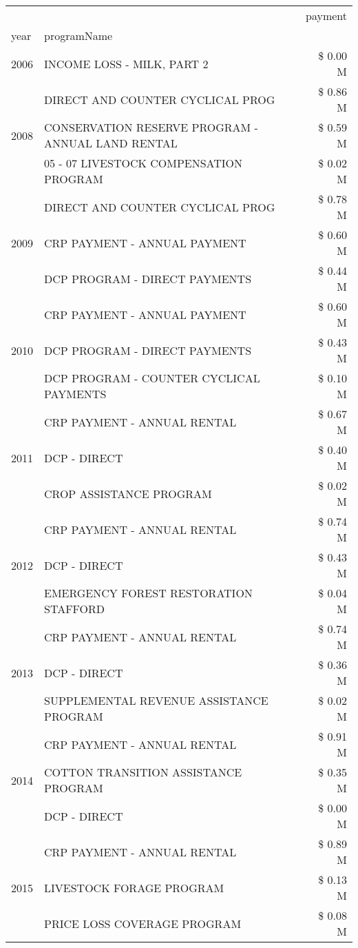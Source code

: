 \begin{tabular}{llr}
\toprule
 &  & payment \\
year & programName &  \\
\midrule
2006 & INCOME LOSS - MILK, PART 2 & \$ 0.00 M \\
\cline{1-3}
\multirow[t]{3}{*}{2008} & DIRECT AND COUNTER CYCLICAL PROG & \$ 0.86 M \\
 & CONSERVATION RESERVE PROGRAM - ANNUAL LAND RENTAL & \$ 0.59 M \\
 & 05 - 07 LIVESTOCK COMPENSATION PROGRAM & \$ 0.02 M \\
\cline{1-3}
\multirow[t]{3}{*}{2009} & DIRECT AND COUNTER CYCLICAL PROG & \$ 0.78 M \\
 & CRP PAYMENT - ANNUAL PAYMENT & \$ 0.60 M \\
 & DCP PROGRAM - DIRECT PAYMENTS & \$ 0.44 M \\
\cline{1-3}
\multirow[t]{3}{*}{2010} & CRP PAYMENT - ANNUAL PAYMENT & \$ 0.60 M \\
 & DCP PROGRAM - DIRECT PAYMENTS & \$ 0.43 M \\
 & DCP PROGRAM - COUNTER CYCLICAL PAYMENTS & \$ 0.10 M \\
\cline{1-3}
\multirow[t]{3}{*}{2011} & CRP PAYMENT - ANNUAL RENTAL & \$ 0.67 M \\
 & DCP - DIRECT & \$ 0.40 M \\
 & CROP ASSISTANCE PROGRAM & \$ 0.02 M \\
\cline{1-3}
\multirow[t]{3}{*}{2012} & CRP PAYMENT - ANNUAL RENTAL & \$ 0.74 M \\
 & DCP - DIRECT & \$ 0.43 M \\
 & EMERGENCY FOREST RESTORATION STAFFORD & \$ 0.04 M \\
\cline{1-3}
\multirow[t]{3}{*}{2013} & CRP PAYMENT - ANNUAL RENTAL & \$ 0.74 M \\
 & DCP - DIRECT & \$ 0.36 M \\
 & SUPPLEMENTAL REVENUE ASSISTANCE PROGRAM & \$ 0.02 M \\
\cline{1-3}
\multirow[t]{3}{*}{2014} & CRP PAYMENT - ANNUAL RENTAL & \$ 0.91 M \\
 & COTTON TRANSITION ASSISTANCE PROGRAM & \$ 0.35 M \\
 & DCP - DIRECT & \$ 0.00 M \\
\cline{1-3}
\multirow[t]{3}{*}{2015} & CRP PAYMENT - ANNUAL RENTAL & \$ 0.89 M \\
 & LIVESTOCK FORAGE PROGRAM & \$ 0.13 M \\
 & PRICE LOSS COVERAGE PROGRAM & \$ 0.08 M \\

\end{tabular}
